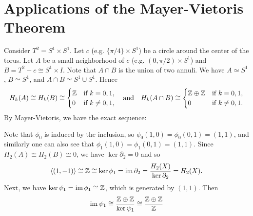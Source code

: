 \section{Applications of the Mayer-Vietoris Theorem}
\begin{example}
  Consider $T^2 = S^1 \times S^1$. Let $c$ (e.g.
  $\{\pi / 4\} \times S^1$) be a
  circle around the center of the torus. Let
  $A$ be a small neighborhood of $c$
  (e.g. $(0, \pi / 2) \times S^1$) and
  $B = T^2 - c \cong S^1 \times I$. Note that
  $A \cap B$ is the union of two annuli.
  We have $A \simeq S^1$, $B \simeq S^1$, and
  $A \cap B \simeq S^1 \cup S^1$. Hence
  \[
    H_k(A) \cong H_k(B) \cong
    \begin{cases}
      \mathbb{Z} & \text{if } k = 0, 1, \\
      0 & \text{if } k \ne 0, 1,
    \end{cases}
    \quad \text{and} \quad
    H_k(A \cap B) \cong
    \begin{cases}
      \mathbb{Z} \oplus \mathbb{Z} & \text{if } k = 0, 1, \\
      0 & \text{if } k \ne 0, 1.
    \end{cases}
  \]
  By Mayer-Vietoris, we have the exact sequence:
  \begin{center}
  \end{center}
  Note that $\phi_0$ is induced by the inclusion,
  so $\phi_0(1, 0) = \phi_0(0, 1) = (1, 1)$, and
  similarly one can also see that
  $\phi_1(1, 0) = \phi_1(0, 1) = (1, 1)$.
  Since $H_2(A) \cong H_2(B) \cong 0$, we have
  $\ker \partial_2 = 0$ and so
  \[
    \langle (1, -1) \rangle \cong \mathbb{Z} \cong \ker \phi_1
    = \operatorname{im} \partial_2 = \frac{H_2(X)}{\ker \partial_2} = H_2(X).
  \]
  Next, we have $\ker \psi_1 = \operatorname{im} \phi_1 \cong \mathbb{Z}$,
  which is generated by $(1, 1)$. Then
  \[
    \operatorname{im} \psi_1
    \cong \frac{\mathbb{Z} \oplus \mathbb{Z}}{\ker \psi_1}
    \cong \frac{\mathbb{Z} \oplus \mathbb{Z}}{\mathbb{Z}}
\]
\end{example}
